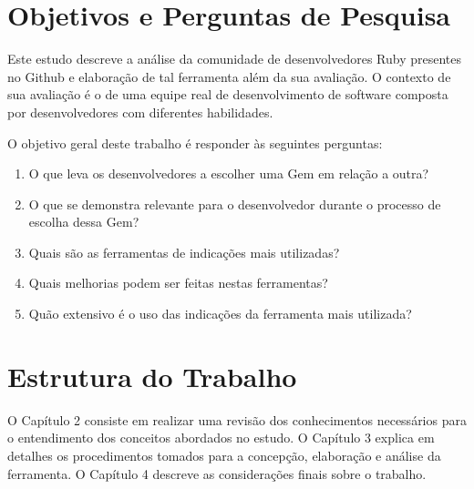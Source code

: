 \section{Objetivos e Perguntas de Pesquisa}

Este estudo descreve a análise da comunidade de desenvolvedores Ruby presentes no Github e elaboração de tal ferramenta além da sua avaliação. O contexto de sua avaliação é o de uma equipe real de desenvolvimento de software composta por desenvolvedores com diferentes habilidades.

O objetivo geral deste trabalho é responder às seguintes perguntas:

\begin{enumerate}
  \item O que leva os desenvolvedores a escolher uma Gem em relação a outra?
  \item O que se demonstra relevante para o desenvolvedor durante o processo de escolha dessa Gem?
  \item Quais são as ferramentas de indicações mais utilizadas?
  \item Quais melhorias podem ser feitas nestas ferramentas?	
  \item Quão extensivo é o uso das indicações da ferramenta mais utilizada?
\end{enumerate}

\section{Estrutura do Trabalho}

O Capítulo 2 consiste em realizar uma revisão dos conhecimentos necessários para o entendimento dos conceitos abordados no estudo. O Capítulo 3 explica em detalhes os procedimentos tomados para a concepção, elaboração e análise da ferramenta. O Capítulo 4 descreve as considerações finais sobre o trabalho.
